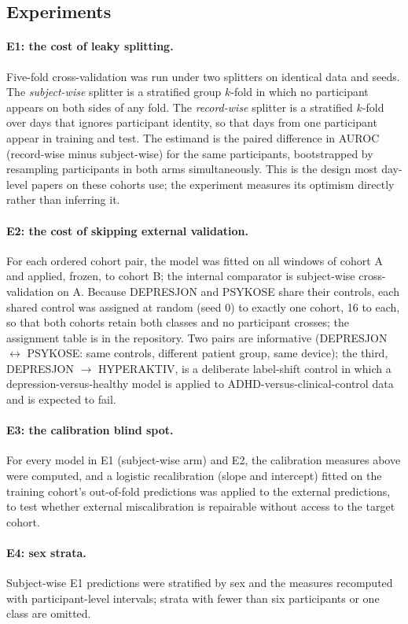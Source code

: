 \documentclass[11pt,a4paper]{article}
\begin{document}
\subsection{Experiments}
\paragraph{E1: the cost of leaky splitting.} Five-fold cross-validation was run under two
splitters on identical data and seeds. The \emph{subject-wise} splitter is a stratified group
$k$-fold in which no participant appears on both sides of any fold. The \emph{record-wise}
splitter is a stratified $k$-fold over days that ignores participant identity, so that days from
one participant appear in training and test. The estimand is the paired difference in AUROC
(record-wise minus subject-wise) for the same participants, bootstrapped by resampling
participants in both arms simultaneously. This is the design most day-level papers on these
cohorts use; the experiment measures its optimism directly rather than inferring it.
\paragraph{E2: the cost of skipping external validation.} For each ordered cohort pair, the
model was fitted on all windows of cohort A and applied, frozen, to cohort B; the internal
comparator is subject-wise cross-validation on A. Because DEPRESJON and PSYKOSE share their
controls, each shared control was assigned at random (seed 0) to exactly one cohort, 16 to each,
so that both cohorts retain both classes and no participant crosses; the assignment table is in
the repository. Two pairs are informative (DEPRESJON $\leftrightarrow$ PSYKOSE: same controls,
different patient group, same device); the third, DEPRESJON $\rightarrow$ HYPERAKTIV, is a
deliberate label-shift control in which a depression-versus-healthy model is applied to
ADHD-versus-clinical-control data and is expected to fail.
\paragraph{E3: the calibration blind spot.} For every model in E1 (subject-wise arm) and E2, the
calibration measures above were computed, and a logistic recalibration (slope and intercept)
fitted on the training cohort's out-of-fold predictions was applied to the external predictions,
to test whether external miscalibration is repairable without access to the target cohort.
\paragraph{E4: sex strata.} Subject-wise E1 predictions were stratified by sex and the measures
recomputed with participant-level intervals; strata with fewer than six participants or one
class are omitted.
\end{document}
